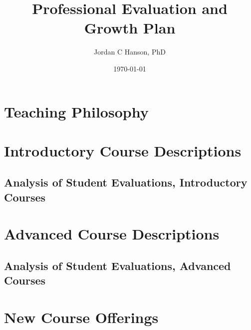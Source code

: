 \documentclass[10pt,oneside]{book}
\title{Professional Evaluation and Growth Plan}
\author{Jordan C Hanson, PhD}
\date{\today}
\begin{document}
\maketitle
\tableofcontents

\clearpage

\section{Teaching Philosophy}

\begin{flushleft}

\end{flushleft}

\clearpage

\section{Introductory Course Descriptions}

\begin{flushleft}

\end{flushleft}

\clearpage

\subsection{Analysis of Student Evaluations, Introductory Courses}

\begin{flushleft}

\end{flushleft}

\clearpage

\section{Advanced Course Descriptions}

\begin{flushleft}

\end{flushleft}

\clearpage

\subsection{Analysis of Student Evaluations, Advanced Courses}

\begin{flushleft}

\end{flushleft}

\clearpage

\section{New Course Offerings}

\begin{flushleft}

\end{flushleft}



\end{document}
